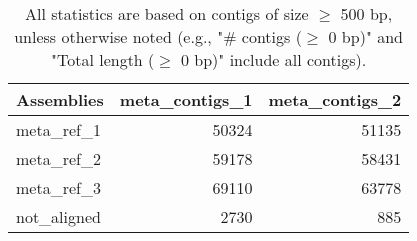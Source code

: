 \documentclass[12pt,a4paper]{article}
\begin{document}
\begin{table}[ht]
\begin{center}
\caption{All statistics are based on contigs of size $\geq$ 500 bp, unless otherwise noted (e.g., "\# contigs ($\geq$ 0 bp)" and "Total length ($\geq$ 0 bp)" include all contigs).}
\begin{tabular}{|l*{2}{|r}|}
\hline
Assemblies & meta\_contigs\_1 & meta\_contigs\_2 \\ \hline
meta\_ref\_1 & 50324 & 51135 \\ \hline
meta\_ref\_2 & 59178 & 58431 \\ \hline
meta\_ref\_3 & 69110 & 63778 \\ \hline
not\_aligned & 2730 & 885 \\ \hline
\end{tabular}
\end{center}
\end{table}
\end{document}
